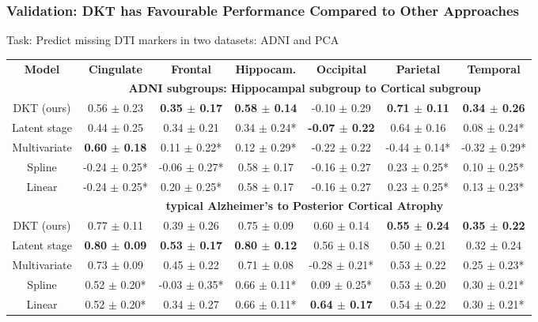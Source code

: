 \documentclass[8pt,xcolor=table]{beamer}
\begin{document}
\begin{frame}[label=current]
\frametitle{Validation: DKT has Favourable Performance Compared to Other Approaches}

Task: Predict missing DTI markers in two datasets: ADNI and PCA

\begin{table}
\centering
\fontsize{5}{8}\selectfont
\begin{tabular}{c | c c c c c c}
\textbf{Model} & \textbf{Cingulate} & \textbf{Frontal} & \textbf{Hippocam.} & \textbf{Occipital} & \textbf{Parietal} & \textbf{Temporal}\\
& \multicolumn{6}{c}{\textbf{ADNI subgroups: Hippocampal subgroup to Cortical subgroup}}\\
DKT (ours) &      0.56 $\pm$ 0.23 &    \textbf{0.35 $\pm$ 0.17} &        \textbf{0.58 $\pm$ 0.14} &     -0.10 $\pm$ 0.29 &     \textbf{0.71 $\pm$ 0.11} &     \textbf{0.34 $\pm$ 0.26} \\
Latent stage &      0.44 $\pm$ 0.25 &    0.34 $\pm$ 0.21 &       0.34 $\pm$ 0.24* &     \textbf{-0.07 $\pm$ 0.22} &     0.64 $\pm$ 0.16 &    0.08 $\pm$ 0.24* \\
Multivariate &      \textbf{0.60 $\pm$ 0.18} &   0.11 $\pm$ 0.22* &       0.12 $\pm$ 0.29* &     -0.22 $\pm$ 0.22 &   -0.44 $\pm$ 0.14* &   -0.32 $\pm$ 0.29* \\
Spline &    -0.24 $\pm$ 0.25* &  -0.06 $\pm$ 0.27* &        0.58 $\pm$ 0.17 &     -0.16 $\pm$ 0.27 &    0.23 $\pm$ 0.25* &    0.10 $\pm$ 0.25* \\
Linear &    -0.24 $\pm$ 0.25* &   0.20 $\pm$ 0.25* &        0.58 $\pm$ 0.17 &     -0.16 $\pm$ 0.27 &    0.23 $\pm$ 0.25* &    0.13 $\pm$ 0.23* \\
& \multicolumn{6}{c}{\textbf{typical Alzheimer's to Posterior Cortical Atrophy}}\\
DKT (ours) &    0.77 $\pm$ 0.11 &    0.39 $\pm$ 0.26 &      0.75 $\pm$ 0.09 &    0.60 $\pm$ 0.14 &    \textbf{0.55 $\pm$ 0.24} &    \textbf{0.35 $\pm$ 0.22} \\
Latent stage &    \textbf{0.80 $\pm$ 0.09} &    \textbf{0.53 $\pm$ 0.17} &      \textbf{0.80 $\pm$ 0.12} &    0.56 $\pm$ 0.18 &    0.50 $\pm$ 0.21 &    0.32 $\pm$ 0.24 \\
Multivariate &   0.73 $\pm$ 0.09 &   0.45 $\pm$ 0.22  &    0.71 $\pm$ 0.08 & -0.28 $\pm$ 0.21* &  0.53 $\pm$ 0.22  &  0.25 $\pm$ 0.23* \\
Spline &   0.52 $\pm$ 0.20* &  -0.03 $\pm$ 0.35* &     0.66 $\pm$ 0.11* &   0.09 $\pm$ 0.25* &    0.53 $\pm$ 0.20 &   0.30 $\pm$ 0.21* \\
Linear &   0.52 $\pm$ 0.20* &    0.34 $\pm$ 0.27 &     0.66 $\pm$ 0.11* &    \textbf{0.64 $\pm$ 0.17} &    0.54 $\pm$ 0.22 &   0.30 $\pm$ 0.21* \\
\end{tabular}
\vspace{0.5em}


\end{table}
\end{frame}
\end{document}
